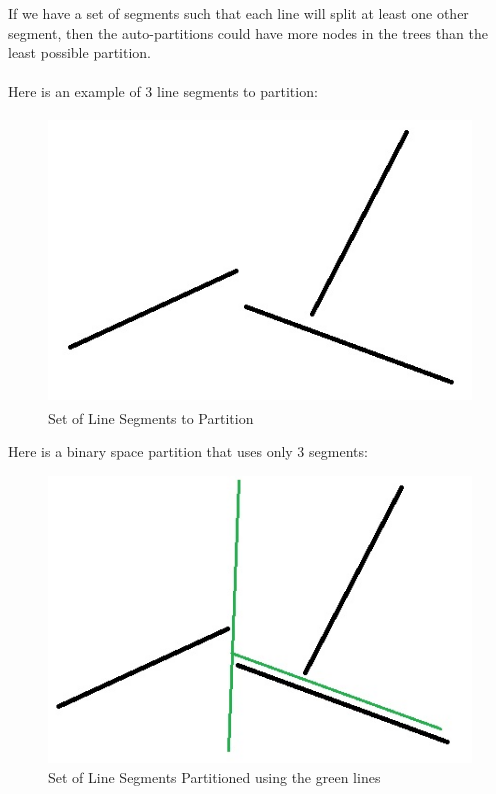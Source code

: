 \documentclass[11pt,psfig]{article}
\begin{document}
If we have a set of segments such that each line will split at least one other segment, then the auto-partitions could have more nodes in the trees than the least possible partition. \\
\\
Here is an example of 3 line segments to partition:
\begin{figure}[H]
\centering
\includegraphics[height=3in]{hw6prob3diagram1.jpg}
\caption{Set of Line Segments to Partition}
\end{figure}
\newpage
Here is a binary space partition that uses only 3 segments:
\begin{figure}[H]
\centering
\includegraphics[height=3in]{hw6prob3diagram2.jpg}
\caption{Set of Line Segments Partitioned using the green lines}
\end{figure}
\end{document}
